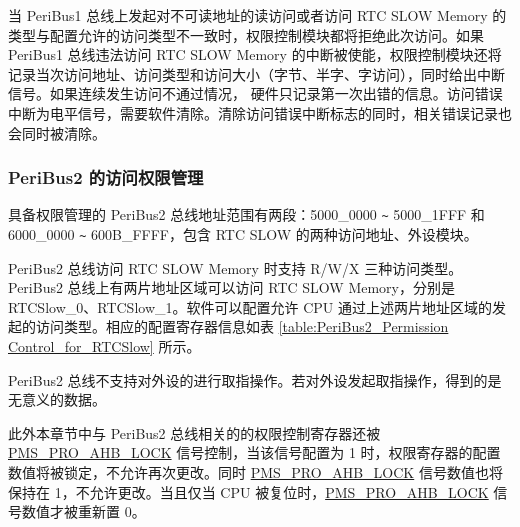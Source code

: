\documentclass[main\_\_CN.tex]{subfiles}
\begin{document}
当 PeriBus1 总线上发起对不可读地址的读访问或者访问 RTC SLOW Memory 的类型与配置允许的访问类型不一致时，权限控制模块都将拒绝此次访问。如果 PeriBus1 总线违法访问 RTC SLOW Memory 的中断被使能，权限控制模块还将记录当次访问地址、访问类型和访问大小（字节、半字、字访问），同时给出中断信号。如果连续发生访问不通过情况， 硬件只记录第一次出错的信息。访问错误中断为电平信号，需要软件清除。清除访问错误中断标志的同时，相关错误记录也会同时被清除。


\subsubsection{PeriBus2 的访问权限管理}
具备权限管理的 PeriBus2 总线地址范围有两段：\hexprefix{}5000\_0000 \verb+~+ \hexprefix{}5000\_1FFF 和 \hexprefix{}6000\_0000 \verb+~+ \hexprefix{}600B\_FFFF，包含 RTC SLOW 的两种访问地址、外设模块。

PeriBus2 总线访问 RTC SLOW Memory 时支持 R/W/X 三种访问类型。PeriBus2 总线上有两片地址区域可以访问 RTC SLOW Memory，分别是 RTCSlow\_0、RTCSlow\_1。软件可以配置允许 CPU 通过上述两片地址区域的发起的访问类型。相应的配置寄存器信息如表 \ref{table:PeriBus2_Permission Control_for_RTCSlow} 所示。

PeriBus2 总线不支持对外设的进行取指操作。若对外设发起取指操作，得到的是无意义的数据。

此外本章节中与 PeriBus2 总线相关的的权限控制寄存器还被 \hyperref[fielddesc:PMSPROAHBLOCK]{PMS\_PRO\_AHB\_LOCK} 信号控制，当该信号配置为 1 时，权限寄存器的配置数值将被锁定，不允许再次更改。同时 \hyperref[fielddesc:PMSPROAHBLOCK]{PMS\_PRO\_AHB\_LOCK} 信号数值也将保持在 1，不允许更改。当且仅当 CPU 被复位时，\hyperref[fielddesc:PMSPROAHBLOCK]{PMS\_PRO\_AHB\_LOCK} 信号数值才被重新置 0。
\end{document}
